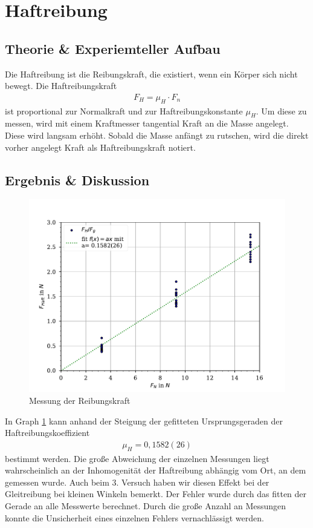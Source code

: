 \documentclass[11pt, a4paper]{article}
\begin{document}
    \section{Haftreibung}
    \subsection{Theorie \& Experiemteller Aufbau}
    Die Haftreibung ist die Reibungskraft, die existiert, wenn ein Körper sich nicht bewegt.
    Die Haftreibungskraft
    \begin{align}
        F_H = \mu_H \cdot F_n
    \end{align}
    ist proportional zur Normalkraft und zur Haftreibungskonstante $\mu_H$. Um diese zu messen,
    wird mit einem Kraftmesser tangential Kraft an die Masse angelegt. Diese wird langsam erhöht.
    Sobald die Masse anfängt zu rutschen, wird die direkt vorher angelegt Kraft als Haftreibungskraft notiert.

    \subsection{Ergebnis \& Diskussion}
    \begin{figure}
        \centering
        \includegraphics[width=\textwidth]{./6Haftreibc.pdf}

        \caption{Messung der Reibungskraft}
        \label{fig:haftr}
    \end{figure}
    In Graph \ref{fig:haftr} kann anhand der Steigung der gefitteten Ursprungsgeraden der Haftreibungskoeffizient
    \begin{align}
        \mu_H = 0,1582(26)
    \end{align} 
    bestimmt werden.
    Die große Abweichung der einzelnen Messungen liegt wahrscheinlich an der Inhomogenität der Haftreibung
    abhängig vom Ort, an dem gemessen wurde. Auch beim 3. Versuch haben wir diesen Effekt
    bei der Gleitreibung bei kleinen Winkeln bemerkt. Der Fehler wurde durch das fitten der Gerade
    an alle Messwerte berechnet. Durch die große Anzahl an Messungen konnte die Unsicherheit eines einzelnen
    Fehlers vernachlässigt werden.
\end{document}
